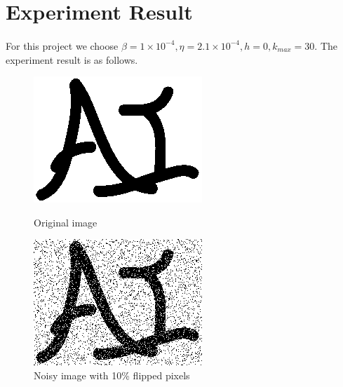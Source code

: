 \documentclass{article}
\begin{document}
\section{Experiment Result}

\paragraph{}
For this project we choose $\beta = 1 \times 10^{-4}, \eta = 2.1 \times 10^{-4}, h = 0, k_{max} = 30$. The experiment result is as follows.

\begin{figure}[H]
	\begin{minipage}[b]{0.48\linewidth}
		\centering
		\includegraphics[width=180pt]{../img/in.png}
		\caption{Original image}
	\end{minipage}
	\begin{minipage}[b]{0.48\linewidth}
		\centering
		\includegraphics[width=180pt]{../img/flipped.png}
		\caption{Noisy image with 10\% flipped pixels}
	\end{minipage}
\end{figure}
\end{document}
